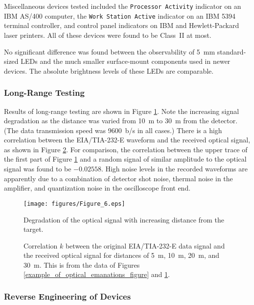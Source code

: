 \documentclass{acmtrans2e}
\begin{document}
Miscellaneous devices tested included the {\tt Processor Activity}
indicator on an IBM AS/400 computer, the {\tt Work Station Active}
indicator on an IBM 5394 terminal controller, and control panel 
indicators on IBM and Hewlett-Packard laser printers.  All of these 
devices were found to be Class~II at most.
 
No significant difference was found between the observability of 5~mm
standard-sized LEDs and the much smaller surface-mount components
used in newer devices.  The absolute brightness levels of these LEDs
are comparable.

\subsubsection{Long-Range Testing}

Results of long-range testing are shown in Figure 
\ref{three_captures_in_a_row}.  Note the increasing signal degradation as the
distance was varied from 10~m to 30~m from
the detector.  (The data transmission speed was 9600~b/s in all
cases.)  There is a high correlation between the
EIA/TIA-232-E waveform and the received optical signal, as shown in Figure 
\ref{correlation_figure}.  For comparison, the correlation between the 
upper trace of the first part of Figure \ref{three_captures_in_a_row} 
and a random signal of similar amplitude to the optical signal was found to be
$-0.02558$.  High noise levels in the recorded waveforms are apparently due 
to a combination of detector shot noise, thermal noise in the amplifier, 
and quantization noise in the oscilloscope front end. 

\begin{figure}
\centering
\texttt{[image: figures/Figure\_6.eps]}
\caption{Degradation of the optical signal with increasing distance
from the target.}
\label{three_captures_in_a_row}
\end{figure}

\begin{figure}
\centering
\caption{Correlation $k$ between the original EIA/TIA-232-E data signal
and the received optical signal for distances of 5~m, 10~m,
20~m, and 30~m.
This is from the data of Figures \ref{example_of_optical_emanations_figure}
and \ref{three_captures_in_a_row}.}
\label{correlation_figure}
\end{figure}

\subsubsection{Reverse Engineering of Devices}
\end{document}
